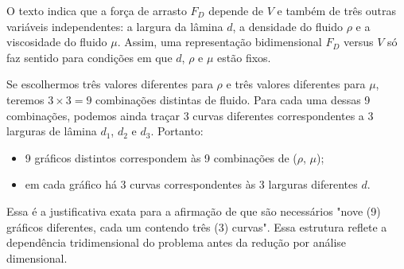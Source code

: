O texto indica que a força de arrasto $F_D$ depende de $V$ e também de três outras variáveis independentes: a largura da lâmina $d$, a densidade do fluido $\rho$ e a viscosidade do fluido $\mu$. Assim, uma representação bidimensional $F_D$ versus $V$ só faz sentido para condições em que $d$, $\rho$ e $\mu$ estão fixos.

Se escolhermos três valores diferentes para $\rho$ e três valores diferentes para $\mu$, teremos $3\times3=9$ combinações distintas de fluido. Para cada uma dessas 9 combinações, podemos ainda traçar 3 curvas diferentes correspondentes a 3 larguras de lâmina $d_1$, $d_2$ e $d_3$. Portanto:

\begin{itemize}
    \item 9 gráficos distintos correspondem às 9 combinações de ($\rho$, $\mu$);
    \item em cada gráfico há 3 curvas correspondentes às 3 larguras diferentes $d$.
\end{itemize}

Essa é a justificativa exata para a afirmação de que são necessários "nove (9) gráficos diferentes, cada um contendo três (3) curvas". Essa estrutura reflete a dependência tridimensional do problema antes da redução por análise dimensional.